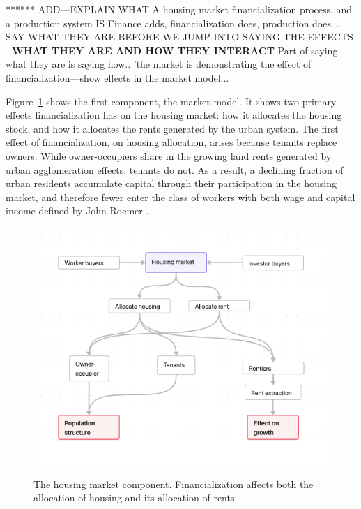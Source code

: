 ****** ADD---EXPLAIN WHAT A housing market financialization process, and a production system IS
Finance adds, financialization does, production does... SAY WHAT THEY ARE BEFORE WE JUMP INTO SAYING THE EFFECTS - \textbf{WHAT THEY ARE AND HOW THEY INTERACT}
Part of saying what they are is saying how.. 
'the market is demonstrating the effect of financialization---show effects in the market model...


Figure~\ref{fig-impacts} shows the first component, the market model.
It shows two primary effects financialization has on the housing market: how it allocates %
the housing stock, and how it allocates the \glspl{rent} generated by the urban system. %
The first effect of financialization, on housing allocation, arises because tenants replace owners. While owner-occupiers share in the growing land rents generated by urban agglomeration effects, tenants do not. As a result, a declining fraction of urban residents accumulate capital through their participation in the housing market, and therefore fewer enter the class of workers with both wage and capital income defined by John Roemer \cite{roemerGeneralTheoryExploitation1982}. 

\begin{figure}[!ht]
    \centering
    \includegraphics[scale=.60]{fig/flow_impacts.png}
    \label{fig-impacts}
\caption[The housing market component of the model.]{The housing market component. Financialization affects both the allocation of housing and its allocation of rents.}
\end{figure}


